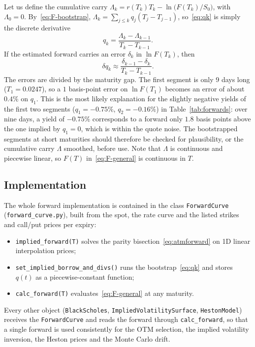 \documentclass[11pt,a4paper]{article}
\theoremstyle{plain}
\theoremstyle{definition}
\begin{document}
Let us define the cumulative carry $\Lambda_k=r(T_k)T_k-\ln\bigl(F(T_k)/S_0\bigr)$, with $\Lambda_0=0$. By~\eqref{eq:F-bootstrap}, $\Lambda_k=\sum_{j\le k}q_j(T_j-T_{j-1})$, so~\eqref{eq:qk} is simply the discrete derivative
\begin{equation}
    q_k=\frac{\Lambda_k-\Lambda_{k-1}}{T_k-T_{k-1}}.
\end{equation}
If the estimated forward carries an error $\delta_k$ in $\ln F(T_k)$, then
\begin{equation}
    \delta q_k\approx\frac{\delta_{k-1}-\delta_k}{T_k-T_{k-1}}.
\end{equation}
The errors are divided by the maturity gap. The first segment is only 9 days long ($T_1=0.0247$), so a $1$ basis-point error on $\ln F(T_1)$ becomes an error of about $0.4\%$ on $q_1$. This is the most likely explanation for the slightly negative yields of the first two segments ($q_1=-0.75\%$, $q_2=-0.16\%$) in Table~\ref{tab:forwards}: over nine days, a yield of $-0.75\%$ corresponds to a forward only $1.8$ basis points above the one implied by $q_1=0$, which is within the quote noise. The bootstrapped segments at short maturities should therefore be checked for plausibility, or the cumulative carry $\Lambda$ smoothed, before use. Note that $\Lambda$ is continuous and piecewise linear, so $F(T)$ in~\eqref{eq:F-general} is continuous in $T$.

\subsection{Implementation}
The whole forward implementation is contained in the class \texttt{ForwardCurve} (\texttt{forward\_curve.py}), built from the spot, the rate curve and the listed strikes and call/put prices per expiry:
\begin{itemize}
    \item \texttt{implied\_forward(T)} solves the parity bisection~\eqref{eq:atmforward} on 1D linear interpolation prices;
    \item \texttt{set\_implied\_borrow\_and\_divs()} runs the bootstrap~\eqref{eq:qk} and stores $q(t)$ as a piecewise-constant function;
    \item \texttt{calc\_forward(T)} evaluates~\eqref{eq:F-general} at any maturity.
\end{itemize}
Every other object (\texttt{BlackScholes}, \texttt{ImpliedVolatilitySurface}, \texttt{HestonModel}) receives the \texttt{ForwardCurve} and reads the forward through \texttt{calc\_forward}, so that a single forward is used consistently for the OTM selection, the implied volatility inversion, the Heston prices and the Monte Carlo drift.
\end{document}
